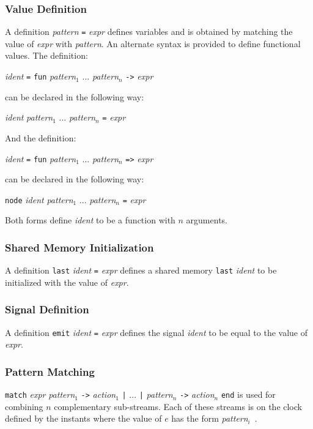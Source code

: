 \documentclass[11pt,titlepage,twoside]{report}
\newcommand{\Fun}{\mbox{{\tt fun}}}
\newcommand{\Node}{\mbox{{\tt node}}}
\newcommand{\Emit}{\mbox{{\tt emit}}}
\newcommand{\Arrow}{\mbox{{\tt ->}}}
\newcommand{\Last}{\mbox{{\tt last}}}
\newcommand{\term}[1]{{\tt #1}}
\newcommand{\nterm}[1]{{\em #1}}
\begin{document}
\subsubsection{Value Definition}
A definition \nterm{pattern} \term{=} \nterm{expr} defines variables
and is obtained by matching the value of \nterm{expr} with
\nterm{pattern}. An alternate syntax is provided to define functional
values. The definition:
\begin{center}
  \nterm{ident} \term{=} \term{\Fun} \nterm{pattern}$_1$ ...
  \nterm{pattern}$_n$ \term{\Arrow} \nterm{expr}
\end{center}
can be declared in the following way:
\begin{center}
  \nterm{ident} \nterm{pattern}$_1$ ... \nterm{pattern}$_n$ 
  \term{=} \nterm{expr}
\end{center}
And the definition:
\begin{center}
  \nterm{ident} \term{=} \term{\Fun}
  \nterm{pattern}$_1$ ... \nterm{pattern}$_n$ \term{=>} \nterm{expr}
\end{center}
can be declared in the following way:
\begin{center}
  \term{\Node} \nterm{ident} \nterm{pattern}$_1$ ...
  \nterm{pattern}$_n$ \term{=} \nterm{expr}
\end{center}
Both forms define \nterm{ident} to be a function with $n$ arguments.

\subsubsection{Shared Memory Initialization}
A definition \term{\Last} \nterm{ident} \term{=} \nterm{expr} defines
a shared memory \term{\Last} \nterm{ident} to be initialized with the
value of \nterm{expr}.

\subsubsection{Signal Definition}
A definition \term{\Emit} \nterm{ident} \term{=} \nterm{expr} defines
the signal \nterm{ident} to be equal to the value of \nterm{expr}.

\subsubsection{Pattern Matching}
\term{match} \nterm{expr} \nterm{pattern}$_1$ \term{->}
\nterm{action}$_1$ \term{|} ... \term{|} \nterm{pattern}$_n$ \term{->}
\nterm{action}$_n$ \term{end} is used for combining $n$ complementary
sub-streams. Each of these streams is on the clock defined by the
instants where the value of $e$ has the form \nterm{pattern}$_i$\ .
\end{document}
